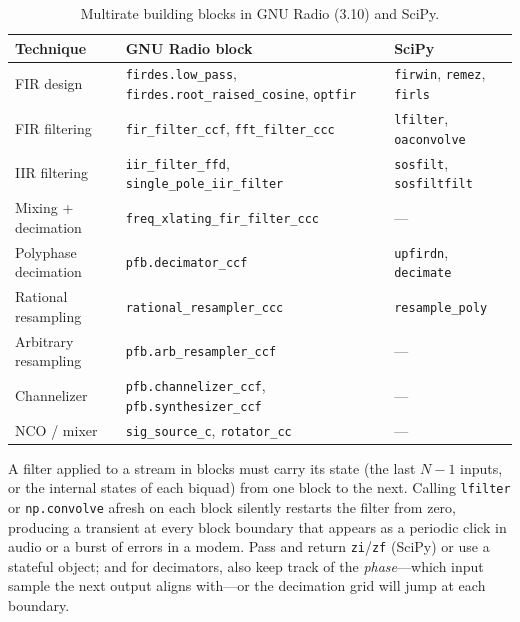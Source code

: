\begin{table}[htbp]\centering\small
\caption{Multirate building blocks in GNU Radio (3.10) and SciPy.}\label{tab:ch06:gr}
\begin{tabular}{>{\raggedright\arraybackslash}p{3.0cm}>{\raggedright\arraybackslash}p{6.0cm}>{\raggedright\arraybackslash}p{4.3cm}}
\toprule
Technique & GNU Radio block & SciPy \\
\midrule
FIR design & \texttt{firdes.low\_pass}, \texttt{firdes.root\_raised\_cosine}, \texttt{optfir} & \texttt{firwin}, \texttt{remez}, \texttt{firls} \\
FIR filtering & \texttt{fir\_filter\_ccf}, \texttt{fft\_filter\_ccc} & \texttt{lfilter}, \texttt{oaconvolve} \\
IIR filtering & \texttt{iir\_filter\_ffd}, \texttt{single\_pole\_iir\_filter} & \texttt{sosfilt}, \texttt{sosfiltfilt} \\
Mixing + decimation & \texttt{freq\_xlating\_fir\_filter\_ccc} & --- \\
Polyphase decimation & \texttt{pfb.decimator\_ccf} & \texttt{upfirdn}, \texttt{decimate} \\
Rational resampling & \texttt{rational\_resampler\_ccc} & \texttt{resample\_poly} \\
Arbitrary resampling & \texttt{pfb.arb\_resampler\_ccf} & --- \\
Channelizer & \texttt{pfb.channelizer\_ccf}, \texttt{pfb.synthesizer\_ccf} & --- \\
NCO / mixer & \texttt{sig\_source\_c}, \texttt{rotator\_cc} & --- \\
\bottomrule
\end{tabular}
\end{table}

\begin{pitfall}
A filter applied to a stream in blocks must carry its state (the last $N-1$ inputs, or the internal
states of each biquad) from one block to the next. Calling \texttt{lfilter} or \texttt{np.convolve}
afresh on each block silently restarts the filter from zero, producing a transient at every block
boundary that appears as a periodic click in audio or a burst of errors in a modem. Pass and return
\texttt{zi}/\texttt{zf} (SciPy) or use a stateful object; and for decimators, also keep track of the
\emph{phase}---which input sample the next output aligns with---or the decimation grid will jump at
each boundary.
\end{pitfall}

